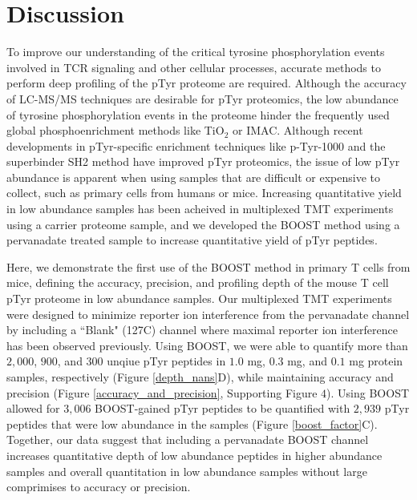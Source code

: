 \documentclass[journal=jprobs,manuscript=article]{achemso}
\begin{document}
\section{Discussion}

To improve our understanding of the critical tyrosine phosphorylation events involved in TCR signaling and other cellular processes, accurate methods to perform deep profiling of the pTyr proteome are required. Although the accuracy of LC-MS/MS techniques are desirable for pTyr proteomics, the low abundance of tyrosine phosphorylation events in the proteome hinder the frequently used global phosphoenrichment methods like TiO$_{2}$ or IMAC\cite{navarro2011phosphoproteomic,prado2021synergistic,thingholm2006highly,thingholm2016use,thingholm2016phosphopeptide}. Although recent developments in pTyr-specific enrichment techniques like p-Tyr-1000 and the superbinder SH2 method have improved pTyr proteomics\cite{kaneko2012superbinder,bian2016ultra,dong2017sensitive,tong2017protein,yao2018sh2,yao2019one,chua2020tandem}, the issue of low pTyr abundance is apparent when using samples that are difficult or expensive to collect, such as primary cells from humans or mice\cite{salter2021comparative,ramello2019immunoproteomic,locard2020lymphoatlas}. Increasing quantitative yield in low abundance samples has been acheived in multiplexed TMT experiments using a carrier proteome sample\cite{petelski2021multiplexed,stopfer2021quantitative,cheung2021defining}, and we developed the BOOST method using a pervanadate treated sample to increase quantitative yield of pTyr peptides\cite{chua2020tandem,chua2021ovalbumin}.

 Here, we demonstrate the first use of the BOOST method in primary T cells from mice, defining the accuracy, precision, and profiling depth of the mouse T cell pTyr proteome in low abundance samples. Our multiplexed TMT experiments were designed to minimize reporter ion interference from the pervanadate channel by including a ``Blank" (127C) channel where maximal reporter ion interference has been observed previously\cite{chua2021ovalbumin,stopfer2021quantitative}. Using BOOST, we were able to quantify more than $2{,}000$, $900$, and $300$ unqiue pTyr peptides in $1.0$ mg, $0.3$ mg, and $0.1$ mg protein samples, respectively (Figure \ref{depth_nans}D), while maintaining accuracy and precision (Figure \ref{accuracy_and_precision}, Supporting Figure $4$). Using BOOST allowed for $3{,}006$ BOOST-gained pTyr peptides to be quantified with $2{,}939$ pTyr peptides that were low abundance in the samples (Figure \ref{boost_factor}C). Together, our data suggest that including a pervanadate BOOST channel increases quantitative depth of low abundance peptides in higher abundance samples and overall quantitation in low abundance samples without large comprimises to accuracy or precision.
\end{document}
